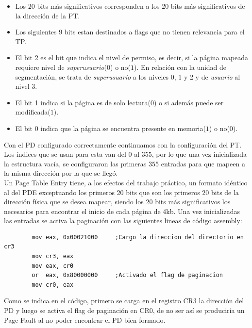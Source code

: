 \documentclass[10pt, a4paper]{article}
\begin{document}
\begin{itemize}
	\item Los 20 bits m\'as significativos corresponden a los 20 bits m\'as significativos de la direcci\'on de la PT.
	\item Los siguientes 9 bits estan destinados a flags que no tienen relevancia para el TP.
	\item El bit 2 es el bit que indica el nivel de permiso, es decir, si la p\'agina mapeada requiere nivel de \textit{superusuario}($0$) o no($1$). En relaci\'on con la unidad de segmentaci\'on, se trata de \textit{superusuario} a los niveles 0, 1 y 2 y de \textit{usuario} al nivel 3.
	\item El bit 1 indica si la p\'agina es de solo lectura($0$) o si adem\'as puede ser modificada($1$).
	\item El bit 0 indica que la p\'agina se encuentra presente en memoria($1$) o no($0$).
\end{itemize}
Con el PD configurado correctamente continuamos con la configuraci\'on del PT. Los \'indices que se usan para esta van del $0$ al $355$, por lo que una vez inicializada la estructura vac\'ia, se configuraron las primeras $355$ entradas para que mapeen a la misma direcci\'on por la que se lleg\'o.\\
Un Page Table Entry tiene, a los efectos del trabajo pr\'actico, un formato id\'entico al del PDE exceptuando los primeros 20 bits que son los primeros 20 bits de la direcci\'on f\'isica que se desea mapear, siendo los 20 bits m\'as significativos los necesarios para encontrar el inicio de cada p\'agina de 4kb.\newline
Una vez inicializadas las entradas se activa la paginaci\'on con las siguientes lineas de c\'odigo assembly:
\begin{center}
	\begin{verbatim}
		mov eax, 0x00021000		;Cargo la direccion del directorio en cr3
		mov cr3, eax
		mov eax, cr0				
		or  eax, 0x80000000		;Activado el flag de paginacion
		mov cr0, eax
	\end{verbatim}
\end{center}
Como se indica en el c\'odigo, primero se carga en el registro CR3 la direcci\'on del PD y luego se activa el flag de paginaci\'on en CR0, de no ser así se producir\'ia un Page Fault al no poder encontrar el PD bien formado.
\end{document}
